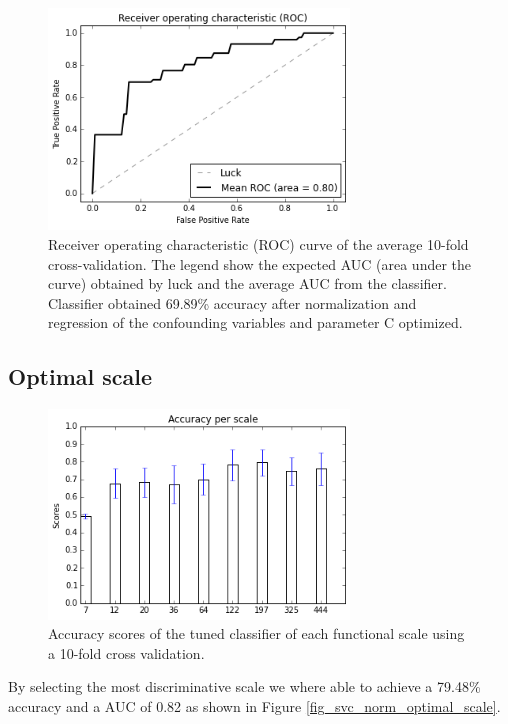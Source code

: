 \documentclass[12pt,journal,compsoc]{IEEEtran}
\begin{document}
\begin{figure}[h]
\centering
\includegraphics[width=8cm]{svc_linear_normalized_scale64x64.png}
\caption{Receiver operating characteristic (ROC) curve of the average 10-fold cross-validation. The legend show the expected AUC (area under the curve) obtained by luck and the average AUC from the classifier. Classifier obtained 69.89\% accuracy after normalization and regression of the confounding variables and parameter C optimized.}
\label{fig_svc_norm}
\end{figure}


\subsection{Optimal scale}


\begin{figure}[h]
\centering
\includegraphics[width=8cm]{acc_scale.png}
\caption{Accuracy scores of the tuned classifier of each functional scale using a 10-fold cross validation.}
\label{fig_scale_svm}
\end{figure}

By selecting the most discriminative scale we where able to achieve a 79.48\% accuracy and a AUC of 0.82 as shown in Figure \ref{fig_svc_norm_optimal_scale}.
\end{document}
